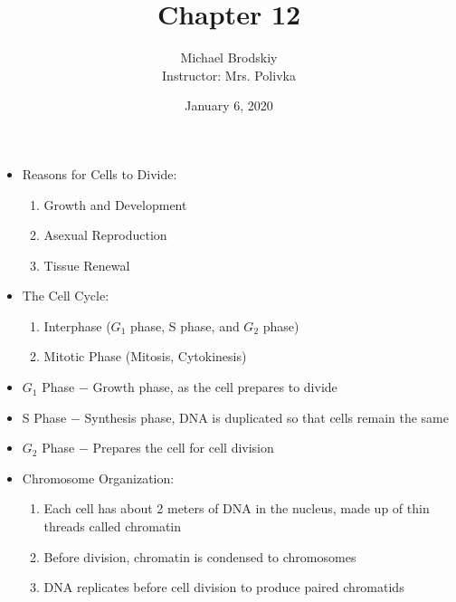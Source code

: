 \documentclass[12pt]{article}
\title{Chapter 12}
\date{January 6, 2020}
\author{Michael Brodskiy\\ \small Instructor: Mrs. Polivka}
\begin{document}
\maketitle

\begin{itemize}
    
  \item Reasons for Cells to Divide:

    \begin{enumerate}

      \item Growth and Development

      \item Asexual Reproduction

      \item Tissue Renewal

    \end{enumerate}

  \item The Cell Cycle:

    \begin{enumerate}

      \item Interphase ($G_1$ phase, S phase, and $G_2$ phase)

      \item Mitotic Phase (Mitosis, Cytokinesis)

    \end{enumerate}

  \item $G_1$ Phase $-$ Growth phase, as the cell prepares to divide

  \item S Phase $-$ Synthesis phase, DNA is duplicated so that cells remain the same

  \item $G_2$ Phase $-$ Prepares the cell for cell division

  \item Chromosome Organization:

    \begin{enumerate}

      \item Each cell has about 2 meters of DNA in the nucleus, made up of thin threads called chromatin

      \item Before division, chromatin is condensed to chromosomes

      \item DNA replicates before cell division to produce paired chromatids


\end{enumerate}
\end{itemize}
\end{document}
